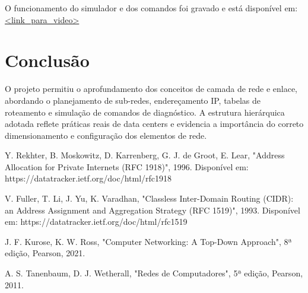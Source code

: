 \documentclass[conference,compsoc]{IEEEtran}
\begin{document}
\begin{otherlanguage}{brazil}
O funcionamento do simulador e dos comandos foi gravado e está disponível em: \\ 
\url{<link_para_video>}

\section{Conclusão}

O projeto permitiu o aprofundamento dos conceitos de camada de rede e enlace, abordando o planejamento de sub-redes, endereçamento IP, tabelas de roteamento e simulação de comandos de diagnóstico. A estrutura hierárquica adotada reflete práticas reais de data centers e evidencia a importância do correto dimensionamento e configuração dos elementos de rede.



%
%
%
\begin{thebibliography}{9}

Y. Rekhter, B. Moskowitz, D. Karrenberg, G. J. de Groot, E. Lear, "Address Allocation for Private Internets (RFC 1918)", 1996. Disponível em: https://datatracker.ietf.org/doc/html/rfc1918

V. Fuller, T. Li, J. Yu, K. Varadhan, "Classless Inter-Domain Routing (CIDR): an Address Assignment and Aggregation Strategy (RFC 1519)", 1993. Disponível em: https://datatracker.ietf.org/doc/html/rfc1519

J. F. Kurose, K. W. Ross, "Computer Networking: A Top-Down Approach", 8ª edição, Pearson, 2021.

A. S. Tanenbaum, D. J. Wetherall, "Redes de Computadores", 5ª edição, Pearson, 2011.

\end{thebibliography}
\end{otherlanguage}
\end{document}
